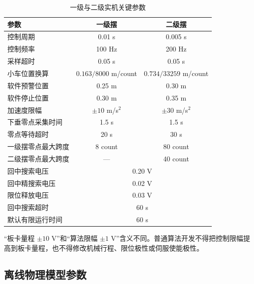 \documentclass[12pt,a4paper]{article}
\begin{document}
\begin{table}[htbp]
    \centering
    \caption{一级与二级实机关键参数}
    \label{tab:runtimeparams}
    \renewcommand{\arraystretch}{1.35}
    \begin{tabular}{@{}p{5.8cm}cc@{}}
        \toprule
        \textbf{参数} & \textbf{一级摆} & \textbf{二级摆} \\
        \midrule
        控制周期 & 0.01 s & 0.005 s \\
        控制频率 & 100 Hz & 200 Hz \\
        采样超时 & 0.05 s & 0.05 s \\
        小车位置换算 & $0.163/8000$ m/count & $0.734/33259$ m/count \\
        软件预警位置 & 0.25 m & 0.30 m \\
        软件停止位置 & 0.30 m & 0.35 m \\
        加速度限幅 & $\pm10$ m/s$^2$ & $\pm30$ m/s$^2$ \\
        下垂零点采集时间 & 1.5 s & 1.5 s \\
        零点等待超时 & 20 s & 30 s \\
        一级摆零点最大跨度 & 8 count & 80 count \\
        二级摆零点最大跨度 & --- & 40 count \\
        回中搜索电压 & \multicolumn{2}{c}{0.20 V} \\
        回中精搜索电压 & \multicolumn{2}{c}{0.02 V} \\
        限位释放电压 & \multicolumn{2}{c}{0.03 V} \\
        回中搜索超时 & \multicolumn{2}{c}{60 s} \\
        默认有限运行时间 & \multicolumn{2}{c}{60 s} \\
        \bottomrule
    \end{tabular}
\end{table}

\begin{warnbox}
    “板卡量程 $\pm10$ V”和“算法限幅 $\pm1$ V”含义不同。普通算法开发不得把控制限幅提高到板卡量程，也不得修改机械行程、限位极性或伺服使能极性。
\end{warnbox}

\subsection{离线物理模型参数}
\end{document}
